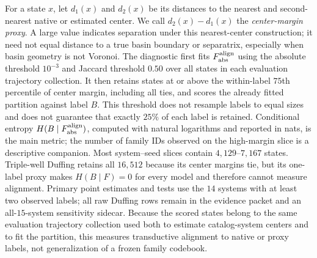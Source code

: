 \documentclass[11pt]{article}
\begin{document}
For a state \(x\), let \(d_1(x)\) and \(d_2(x)\) be its distances to the nearest and second-nearest native or estimated center. We call \(d_2(x)-d_1(x)\) the \textit{center-margin proxy}. A large value indicates separation under this nearest-center construction; it need not equal distance to a true basin boundary or separatrix, especially when basin geometry is not Voronoi.
The diagnostic first fits \(F_{\rm abs}^{\rm align}\) using the absolute threshold \(10^{-3}\) and Jaccard threshold \(0.50\) over all states in each evaluation trajectory collection. It then retains states at or above the within-label \(75\)th percentile of center margin, including all ties, and scores the already fitted partition against label \(B\). This threshold does not resample labels to equal sizes and does not guarantee that exactly \(25\%\) of each label is retained. Conditional entropy \(H(B\mid F_{\rm abs}^{\rm align})\), computed with natural logarithms and reported in nats, is the main metric; the number of family IDs observed on the high-margin slice is a descriptive companion. Most system--seed slices contain \(4{,}129\)--\(7{,}167\) states. Triple-well Duffing retains all \(16{,}512\) because its center margins tie, but its one-label proxy makes \(H(B\mid F)=0\) for every model and therefore cannot measure alignment. Primary point estimates and tests use the \(14\) systems with at least two observed labels; all raw Duffing rows remain in the evidence packet and an all-\(15\)-system sensitivity sidecar. Because the scored states belong to the same evaluation trajectory collection used both to estimate catalog-system centers and to fit the partition, this measures transductive alignment to native or proxy labels, not generalization of a frozen family codebook.

\begin{table}[tbp]
\centering
\caption{Transductive basin-support diagnostics on the \(14\) controlled systems whose frozen evaluation assignment realizes at least two labels. \(F_{\rm abs}\) is fitted over all states in each evaluation trajectory collection with absolute threshold \(10^{-3}\) and Jaccard threshold \(0.50\), then scored at or above the within-label \(75\)th center-margin percentile, retaining ties. Labels and centers are native for two gated systems and nearest-center proxies from deterministic endpoint clustering at the known benchmark count for the catalog systems. They define and score the subset but do not enter family formation or equalize label counts. \(H(B\mid F_{\rm abs})\) uses natural logarithms and is reported in nats. \(\overline{|F_{\rm abs}|}\) counts family IDs observed on the scored slice and uses ordinary seed means. Triple-well Duffing's proxy realizes one label, so its identically zero entropy is excluded from primary aggregates; its raw rows and all-\(15\)-system sensitivity are retained. Superscripts mark Wilcoxon/Holm tests against Dense MLP (\(\ast\), \(p<0.05\)); all displayed stars pass on all \(14/14\) eligible systems. \textbf{Bold} marks the best directional entry.}
\label{tab:controlled_alignment}
\label{tab:support_diagnostics_main}
{\setlength{\tabcolsep}{4pt}
\resizebox{0.62\textwidth}{!}{}}
\end{table}
\end{document}

